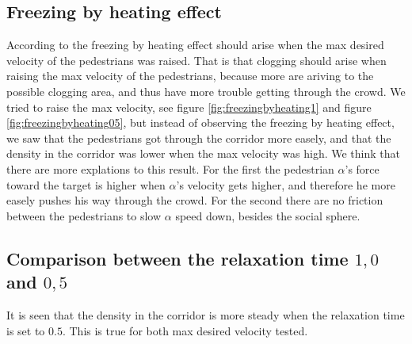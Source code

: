 \subsection{Freezing by heating effect}
According to \cite{self-org} the freezing by heating effect should arise when the max desired velocity of the pedestrians was raised.
That is that clogging should arise when raising the max velocity of the pedestrians, because more are ariving to the possible
clogging area, and thus have more trouble getting through the crowd. 
We tried to raise the max velocity, see figure \ref{fig:freezingbyheating1} and figure \ref{fig:freezingbyheating05}, but instead of observing the freezing by heating effect, we saw that the pedestrians
got through the corridor more easely, and that the density in the corridor was lower when the max velocity was high.
We think that there are more explations to this result. For the first the pedestrian $\alpha$'s force toward the target
is higher when $\alpha$'s velocity gets higher, and therefore he more easely pushes his way through the crowd. For the second
there are no friction between the pedestrians to slow $\alpha$ speed down, besides the social sphere.

\subsection{Comparison between the relaxation time $1,0$ and $0,5$}
It is seen that the density in the corridor is more steady when the relaxation time is set to $0.5$.
This is true for both max desired velocity tested.

